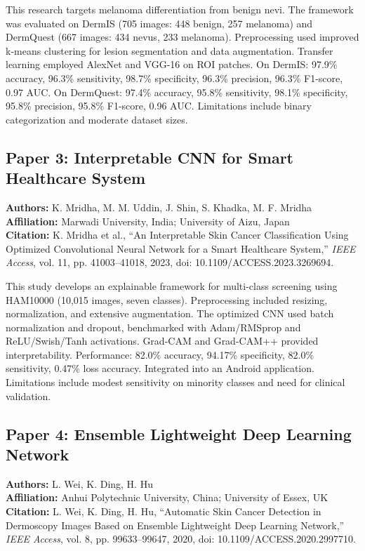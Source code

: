 \documentclass[conference]{IEEEtran}
\begin{document}
This research targets melanoma differentiation from benign nevi. The framework was evaluated on DermIS (705 images: 448 benign, 257 melanoma) and DermQuest (667 images: 434 nevus, 233 melanoma). Preprocessing used improved k-means clustering for lesion segmentation and data augmentation. Transfer learning employed AlexNet and VGG-16 on ROI patches. On DermIS: 97.9\% accuracy, 96.3\% sensitivity, 98.7\% specificity, 96.3\% precision, 96.3\% F1-score, 0.97 AUC. On DermQuest: 97.4\% accuracy, 95.8\% sensitivity, 98.1\% specificity, 95.8\% precision, 95.8\% F1-score, 0.96 AUC. Limitations include binary categorization and moderate dataset sizes.

\subsection{Paper 3: Interpretable CNN for Smart Healthcare System}

\noindent\textbf{Authors:} K. Mridha, M. M. Uddin, J. Shin, S. Khadka, M. F. Mridha\\
\textbf{Affiliation:} Marwadi University, India; University of Aizu, Japan\\
\textbf{Citation:} K. Mridha et al., ``An Interpretable Skin Cancer Classification Using Optimized Convolutional Neural Network for a Smart Healthcare System,'' \textit{IEEE Access}, vol. 11, pp. 41003--41018, 2023, doi: 10.1109/ACCESS.2023.3269694.

This study develops an explainable framework for multi-class screening using HAM10000 (10,015 images, seven classes). Preprocessing included resizing, normalization, and extensive augmentation. The optimized CNN used batch normalization and dropout, benchmarked with Adam/RMSprop and ReLU/Swish/Tanh activations. Grad-CAM and Grad-CAM++ provided interpretability. Performance: 82.0\% accuracy, 94.17\% specificity, 82.0\% sensitivity, 0.47\% loss accuracy. Integrated into an Android application. Limitations include modest sensitivity on minority classes and need for clinical validation.

\subsection{Paper 4: Ensemble Lightweight Deep Learning Network}

\noindent\textbf{Authors:} L. Wei, K. Ding, H. Hu\\
\textbf{Affiliation:} Anhui Polytechnic University, China; University of Essex, UK\\
\textbf{Citation:} L. Wei, K. Ding, H. Hu, ``Automatic Skin Cancer Detection in Dermoscopy Images Based on Ensemble Lightweight Deep Learning Network,'' \textit{IEEE Access}, vol. 8, pp. 99633--99647, 2020, doi: 10.1109/ACCESS.2020.2997710.
\end{document}
